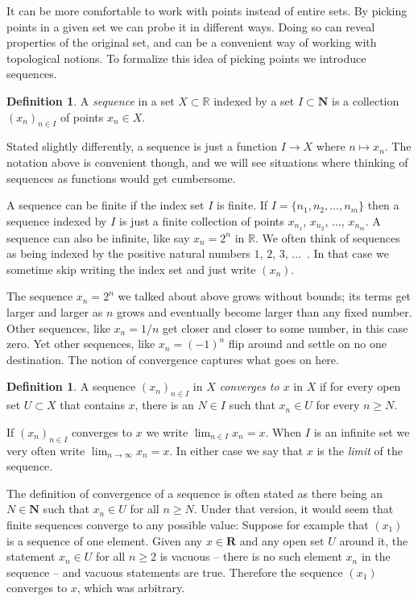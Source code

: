 \documentclass[11pt]{article}
\theoremstyle{definition}
\newtheorem{defi}[theo]{Definition}
\newcommand{\kk}[1]{\mathbb{#1}}
\def\NN{\mathbf{N}}
\def\RR{\mathbf{R}}
\begin{document}
It can be more comfortable to work with points instead of entire sets.
By picking points in a given set we can probe it in different ways.
Doing so can reveal properties of the original set, and can be a convenient way
of working with topological notions.
To formalize this idea of picking points we introduce sequences.


\begin{defi}
A \emph{sequence} in a set $X \subset \kk R$ indexed by a set $I \subset \NN$
is a collection $(x_n)_{n \in I}$ of points $x_n \in X$.
\end{defi}

Stated slightly differently, a sequence is just a function $I \to X$ where
$n \mapsto x_n$.
The notation above is convenient though, and we will see situations where
thinking of sequences as functions would get cumbersome.

A sequence can be finite if the index set $I$ is finite. If $I = \{n_1, n_2,
\ldots, n_m\}$ then a sequence indexed by $I$ is just a finite collection of
points $x_{n_1}$, $x_{n_2}$, $\ldots$, $x_{n_m}$.
A sequence can also be infinite, like say $x_n = 2^n$ in $\kk R$.
We often think of sequences as being indexed by the positive natural numbers
$1$, $2$, $3$, $\ldots$~.
In that case we sometime skip writing the index set and just write $(x_n)$.

The sequence $x_n = 2^n$ we talked about above grows without bounds; its terms
get larger and larger as $n$ grows and eventually become larger than any fixed
number. Other sequences, like $x_n = 1/n$ get closer and closer to some number,
in this case zero. Yet other sequences, like $x_n = (-1)^n$ flip around and
settle on no one destination. The notion of convergence captures what goes on here.


\begin{defi}
A sequence $(x_n)_{n \in I}$ in $X$ \emph{converges to $x$} in $X$ if for every
open set $U \subset X$ that contains $x$, there is an $N \in I$ such that
$x_n \in U$ for every $n \geq N$.
\end{defi}

If $(x_n)_{n \in I}$ converges to $x$ we write $\lim_{n \in I} x_n = x$.
When $I$ is an infinite set we very often write $\lim_{n \to \infty} x_n = x$.
In either case we say that $x$ is the \emph{limit} of the sequence.

The definition of convergence of a sequence is often stated as there being an
$N \in \NN$ such that $x_n \in U$ for all $n \geq N$.
Under that version, it would seem that finite sequences converge to any
possible value:
Suppose for example that $(x_1)$ is a sequence of one element.
Given any $x \in \RR$ and any open set $U$ around it, the statement $x_n \in U$
for all $n \geq 2$ is vacuous -- there is no such element $x_n$ in the sequence
-- and vacuous statements are true.
Therefore the sequence $(x_1)$ converges to $x$, which was arbitrary.
\end{document}
